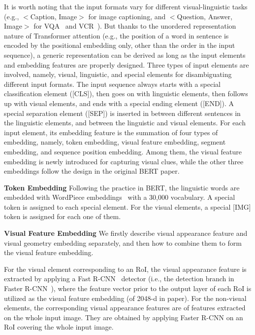 It is worth noting that the input formats vary for different visual-linguistic tasks (e.g., $<$Caption, Image$>$ for image captioning, and $<$Question, Answer, Image$>$ for VQA~\citep{antol2015vqa,johnson2017clevr,goyal2017making,hudson2019gqa} and VCR~\citep{zellers2019vcr,gao2019two}). But thanks to the unordered representation nature of Transformer attention (e.g., the position of a word in sentence is encoded by the positional embedding only, other than the order in the input sequence), a generic representation can be derived as long as the input elements and embedding features are properly designed. Three types of input elements are involved, namely, visual, linguistic, and special elements for disambiguating different input formats. The input sequence always starts with a special classification element ([CLS]), then goes on with linguistic elements, then follows up with visual elements, and ends with a special ending element ([END]). A special separation element ([SEP]) is inserted in between different sentences in the linguistic elements, and between the linguistic and visual elements. For each input element, its embedding feature is the summation of four types of embedding, namely, token embedding, visual feature embedding, segment embedding, and sequence position embedding. Among them, the visual feature embedding is newly introduced for capturing visual clues, while the other three embeddings follow the design in the original BERT paper.

\textbf{Token Embedding} Following the practice in BERT, the linguistic words are embedded with WordPiece embeddings~\citep{wu2016google} with a 30,000 vocabulary. A special token is assigned to each special element. For the visual elements, a special [IMG] token is assigned for each one of them.

\textbf{Visual Feature Embedding} We firstly describe visual appearance feature and visual geometry embedding separately, and then how to combine them to form the visual feature embedding. 

For the visual element corresponding to an RoI, the visual appearance feature is extracted by applying a Fast R-CNN~\citep{girshick2015fast} detector (i.e., the detection branch in Faster R-CNN~\citep{ren2015faster}), where the feature vector prior to the output layer of each RoI is utilized as the visual feature embedding (of 2048-d in paper). For the non-visual elements, the corresponding visual appearance features are of features extracted on the whole input image. They are obtained by applying Faster R-CNN on an RoI covering the whole input image. 

